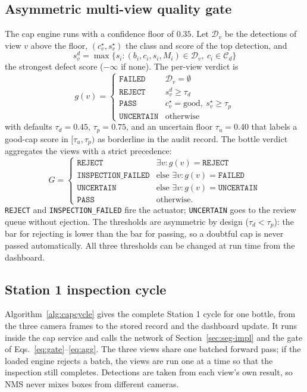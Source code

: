 \subsection{Asymmetric multi-view quality gate}
\label{sec:gate-impl}
The cap engine runs with a confidence floor of $0.35$. Let $\mathcal{D}_v$ be the detections of view $v$ above the floor, $(c^\star_v, s^\star_v)$ the class and score of the top detection, and
\begin{equation}
    s^{d}_v = \max\{s_i : (b_i,c_i,s_i,M_i)\in\mathcal{D}_v,\ c_i\in\mathcal{C}_d\}
\end{equation}
the strongest defect score ($-\infty$ if none). The per-view verdict is
\begin{equation}
    g(v)=\begin{cases}
    \texttt{FAILED} & \mathcal{D}_v=\emptyset\\
    \texttt{REJECT} & s^{d}_v \geq \tau_d\\
    \texttt{PASS} & c^\star_v=\text{good},\ s^\star_v\geq\tau_p\\
    \texttt{UNCERTAIN} & \text{otherwise}
    \end{cases}
    \label{eq:gate}
\end{equation}
with defaults $\tau_d=0.45$, $\tau_p=0.75$, and an uncertain floor $\tau_u=0.40$ that labels a good-cap score in $[\tau_u,\tau_p)$ as borderline in the audit record. The bottle verdict aggregates the views with a strict precedence:
\begin{equation}
    G = \begin{cases}
    \texttt{REJECT} & \exists v: g(v)=\texttt{REJECT}\\
    \texttt{INSPECTION\_FAILED} & \text{else } \exists v: g(v)=\texttt{FAILED}\\
    \texttt{UNCERTAIN} & \text{else } \exists v: g(v)=\texttt{UNCERTAIN}\\
    \texttt{PASS} & \text{otherwise.}
    \end{cases}
    \label{eq:agg}
\end{equation}
\texttt{REJECT} and \texttt{INSPECTION\_FAILED} fire the actuator; \texttt{UNCERTAIN} goes to the review queue without ejection. The thresholds are asymmetric by design ($\tau_d<\tau_p$): the bar for rejecting is lower than the bar for passing, so a doubtful cap is never passed automatically. All three thresholds can be changed at run time from the dashboard.

\subsection{Station 1 inspection cycle}
\label{sec:cap-cycle}
Algorithm~\ref{alg:capcycle} gives the complete Station 1 cycle for one bottle, from the three camera frames to the stored record and the dashboard update. It runs inside the cap service and calls the network of Section~\ref{sec:seg-impl} and the gate of Eqs.~\eqref{eq:gate}--\eqref{eq:agg}. The three views share one batched forward pass; if the loaded engine rejects a batch, the views are run one at a time so that the inspection still completes. Detections are taken from each view's own result, so NMS never mixes boxes from different cameras.

